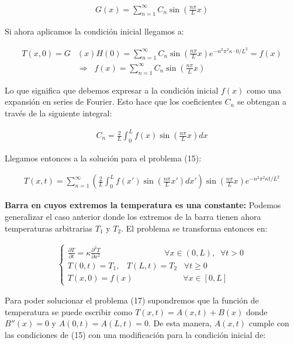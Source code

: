 \documentclass[12pt]{article}
\begin{document}
\begin{align*}
    G(x) = \sum_{n=1}^{\infty} C_n\sin\left(\frac{n\pi}{L}x\right)
\end{align*}

Si ahora aplicamos la condición inicial llegamos a:

\begin{align*}
    T(x,0) = G&(x)H(0) = \sum_{n=1}^{\infty} C_n\sin\left(\frac{n\pi}{L}x\right) e^{-n^2\pi^2\kappa \cdot 0/L^2} = f(x) \\
    &\Rightarrow \;\; f(x) = \sum_{n=1}^{\infty} C_n\sin\left(\frac{n\pi}{L}x\right)
\end{align*}

Lo que significa que debemos expresar a la condición inicial $f(x)$ como una expansión en series de Fourier. Esto hace que los coeficientes $C_n$ se obtengan a través de la siguiente integral:

\begin{align*}
    C_n = \frac{2}{L}\int_0^L f(x)\sin \left(\frac{n\pi}{L}x\right)dx 
\end{align*}

Llegamos entonces a la solución para el problema (15):

\begin{align}
    T(x,t) = \sum_{n=1}^{\infty} \left(\frac{2}{L}\int_0^L f(x')\sin \left(\frac{n\pi}{L}x'\right)dx'\right)\sin\left(\frac{n\pi}{L}x\right) e^{-n^2\pi^2\kappa t/L^2}
\end{align}

\textbf{Barra en cuyos extremos la temperatura es una constante: } Podemos generalizar el caso anterior donde los extremos de la barra tienen ahora temperaturas arbitrarias $T_1$ y $T_2$. El problema se transforma entonces en:

\begin{align}
    \begin{cases}
        \frac{\partial T}{\partial t} = \kappa \frac{\partial^2 T}{\partial x^2} \;\;\;\;\;\;\;\;\;\;\;\;\;\;\;\;\;\;\;\;\;\;\;\;\;\;\;\; \forall x\in (0,L), \;\; \forall t>0 \\
        T(0,t) = T_1, \;\;\; T(L,t) = T_2 \;\;\; \forall t \geq 0 \\
        T(x,0) = f(x) \;\;\;\;\;\;\;\;\;\;\;\;\;\;\;\;\;\;\;\;\;\; \forall x\in [0,L]
    \end{cases}
\end{align}

Para poder solucionar el problema (17) supondremos que la función de temperatura se puede escribir como $T(x,t) = A(x,t)+B(x)$ donde $B''(x) = 0$ y $A(0,t) = A(L,t) = 0$. De esta manera, $A(x,t)$ cumple con las condiciones de (15) con una modificación para la condición inicial de:
\end{document}
